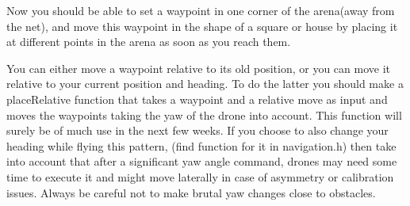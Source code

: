\documentclass{article}
\begin{document}
Now you should be able to set a waypoint in one corner of the arena(away from the net), and move this waypoint in the shape of a square or house by placing it at different points in the arena as soon as you reach them. 

You can either move a waypoint relative to its old position, or you can move it relative to your current position and heading. To do the latter you should make a placeRelative function that takes a waypoint and a relative move as input and moves the waypoints taking the yaw of the drone into account. This function will surely be of much use in the next few weeks. If you choose to also change your heading while flying this pattern, (find function for it in navigation.h) then take into account that after a significant yaw angle command, drones may need some time to execute it and might move laterally in case of asymmetry or calibration issues. Always be careful not to make brutal yaw changes close to obstacles.
\end{document}
